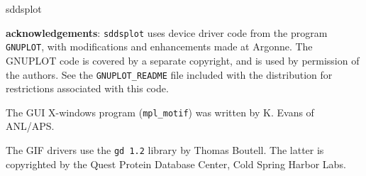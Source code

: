 \begin{sddsprog}{sddsplot}
  \item \textbf{acknowledgements}: \verb|sddsplot| uses device driver code from the program {\tt GNUPLOT},
with modifications and enhancements made at Argonne.  The GNUPLOT code is covered by a separate
copyright, and is used by permission of the authors.  See the {\tt GNUPLOT\_README} file included
with the distribution for restrictions associated with this code.

The GUI X-windows program ({\tt mpl\_motif}) was written by K. Evans of ANL/APS.

The GIF drivers use the {\tt gd 1.2} library by Thomas Boutell.  The latter is copyrighted by the
Quest Protein Database Center, Cold Spring Harbor Labs.

\end{sddsprog}


